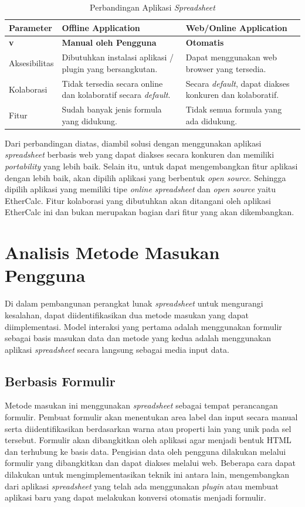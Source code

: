 \begin{small}
\begin{longtable}{ | p{3cm} | p{4cm} | p{4cm} | }
    \caption{Perbandingan Aplikasi \textit{Spreadsheet}}
    \label{AnalisisAplikasiDasar}\\ \hline
    \centering\bfseries{Parameter} & \centering\bfseries{Offline Application} & \centering\bfseries{Web/Online Application} \tabularnewline \hline
    \endfirsthead
    \hline
    \centering\bfseries{v} & \centering\bfseries{Manual oleh Pengguna} & \centering\bfseries{Otomatis} \tabularnewline \hline
    \endhead
    Aksesibilitas & Dibutuhkan instalasi aplikasi / plugin yang bersangkutan. & Dapat menggunakan web browser yang tersedia. \\ \hline
    Kolaborasi & Tidak tersedia secara online dan kolaboratif secara \textit{default}. & Secara \textit{default}, dapat diakses konkuren dan kolaboratif. \\ \hline
    Fitur & Sudah banyak jenis formula yang didukung. & Tidak semua formula yang ada didukung. \\ \hline
\end{longtable}
\end{small}

Dari perbandingan diatas, diambil solusi dengan menggunakan aplikasi \textit{spreadsheet} berbasis web yang dapat diakses secara konkuren dan memiliki \textit{portability} yang lebih baik. Selain itu, untuk dapat mengembangkan fitur aplikasi dengan lebih baik, akan dipilih aplikasi yang berbentuk \textit{open source}. Sehingga dipilih aplikasi yang memiliki tipe \textit{online spreadsheet} dan \textit{open source} yaitu EtherCalc. Fitur kolaborasi yang dibutuhkan akan ditangani oleh aplikasi EtherCalc ini dan bukan merupakan bagian dari fitur yang akan dikembangkan.

\section{Analisis Metode Masukan Pengguna}
Di dalam pembangunan perangkat lunak \textit{spreadsheet} untuk mengurangi kesalahan, dapat diidentifikasikan dua metode masukan yang dapat diimplementasi. Model interaksi yang pertama adalah menggunakan formulir sebagai basis masukan data dan metode yang kedua adalah menggunakan aplikasi \textit{spreadsheet} secara langsung sebagai media input data.
	\subsection{Berbasis Formulir}
	Metode masukan ini menggunakan \textit{spreadsheet} sebagai tempat perancangan formulir. Pembuat formulir akan menentukan area label dan input secara manual serta diidentifikasikan berdasarkan warna atau properti lain yang unik pada sel tersebut. Formulir akan dibangkitkan oleh aplikasi agar menjadi bentuk HTML dan terhubung ke basis data. Pengisian data oleh pengguna dilakukan melalui formulir yang dibangkitkan dan dapat diakses melalui web. Beberapa cara dapat dilakukan untuk mengimplementasikan teknik ini antara lain, mengembangkan dari aplikasi \textit{spreadsheet} yang telah ada menggunakan \textit{plugin} atau membuat aplikasi baru yang dapat melakukan konversi otomatis menjadi formulir.

